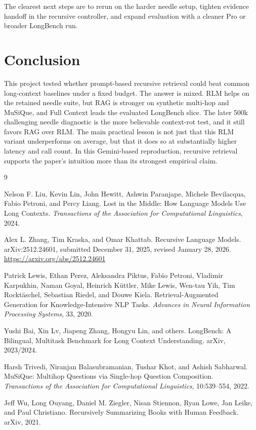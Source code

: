 \documentclass[11pt]{article}
\begin{document}
The clearest next steps are to rerun on the harder needle setup, tighten evidence handoff in the recursive controller, and expand evaluation with a cleaner Pro or broader LongBench run.

\section{Conclusion}
This project tested whether prompt-based recursive retrieval could beat common long-context baselines under a fixed budget. The answer is mixed. RLM helps on the retained needle suite, but RAG is stronger on synthetic multi-hop and MuSiQue, and Full Context leads the evaluated LongBench slice. The later 500k challenging needle diagnostic is the more believable context-rot test, and it still favors RAG over RLM. The main practical lesson is not just that this RLM variant underperforms on average, but that it does so at substantially higher latency and call count. In this Gemini-based reproduction, recursive retrieval supports the paper's intuition more than its strongest empirical claim.

\begin{thebibliography}{9}

Nelson F. Liu, Kevin Lin, John Hewitt, Ashwin Paranjape, Michele Bevilacqua, Fabio Petroni, and Percy Liang.
\newblock Lost in the Middle: How Language Models Use Long Contexts.
\newblock \emph{Transactions of the Association for Computational Linguistics}, 2024.

Alex L. Zhang, Tim Kraska, and Omar Khattab.
\newblock Recursive Language Models.
\newblock arXiv:2512.24601, submitted December 31, 2025, revised January 28, 2026.
\newblock \url{https://arxiv.org/abs/2512.24601}

Patrick Lewis, Ethan Perez, Aleksandra Piktus, Fabio Petroni, Vladimir Karpukhin, Naman Goyal, Heinrich K{\"u}ttler, Mike Lewis, Wen-tau Yih, Tim Rockt{\"a}schel, Sebastian Riedel, and Douwe Kiela.
\newblock Retrieval-Augmented Generation for Knowledge-Intensive NLP Tasks.
\newblock \emph{Advances in Neural Information Processing Systems}, 33, 2020.

Yushi Bai, Xin Lv, Jiapeng Zhang, Hongyu Lin, and others.
\newblock LongBench: A Bilingual, Multitask Benchmark for Long Context Understanding.
\newblock arXiv, 2023/2024.

Harsh Trivedi, Niranjan Balasubramanian, Tushar Khot, and Ashish Sabharwal.
\newblock MuSiQue: Multihop Questions via Single-hop Question Composition.
\newblock \emph{Transactions of the Association for Computational Linguistics}, 10:539--554, 2022.

Jeff Wu, Long Ouyang, Daniel M. Ziegler, Nisan Stiennon, Ryan Lowe, Jan Leike, and Paul Christiano.
\newblock Recursively Summarizing Books with Human Feedback.
\newblock arXiv, 2021.

\end{thebibliography}
\end{document}
